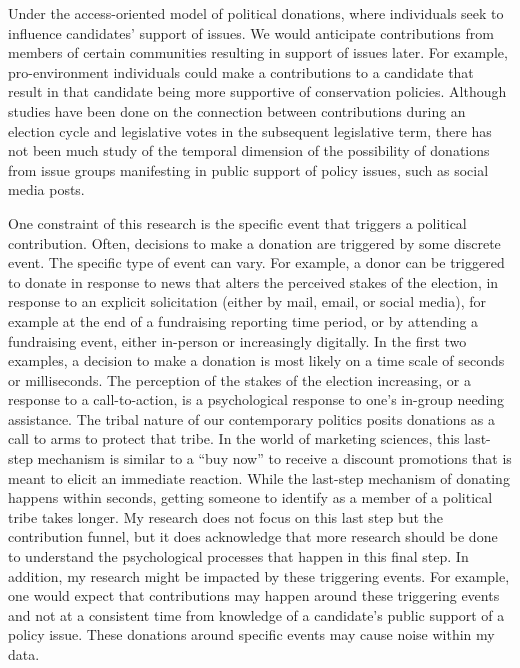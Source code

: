 \documentclass[12pt,]{article}
\begin{document}
Under the access-oriented model of political donations, where
individuals seek to influence candidates' support of issues. We would
anticipate contributions from members of certain communities resulting
in support of issues later. For example, pro-environment individuals
could make a contributions to a candidate that result in that candidate
being more supportive of conservation policies. Although studies have
been done on the connection between contributions during an election
cycle and legislative votes in the subsequent legislative term, there
has not been much study of the temporal dimension of the possibility of
donations from issue groups manifesting in public support of policy
issues, such as social media posts.

One constraint of this research is the specific event that triggers a
political contribution. Often, decisions to make a donation are
triggered by some discrete event. The specific type of event can vary.
For example, a donor can be triggered to donate in response to news that
alters the perceived stakes of the election, in response to an explicit
solicitation (either by mail, email, or social media), for example at
the end of a fundraising reporting time period, or by attending a
fundraising event, either in-person or increasingly digitally. In the
first two examples, a decision to make a donation is most likely on a
time scale of seconds or milliseconds. The perception of the stakes of
the election increasing, or a response to a call-to-action, is a
psychological response to one's in-group needing assistance. The tribal
nature of our contemporary politics posits donations as a call to arms
to protect that tribe. In the world of marketing sciences, this
last-step mechanism is similar to a ``buy now'' to receive a discount
promotions that is meant to elicit an immediate reaction. While the
last-step mechanism of donating happens within seconds, getting someone
to identify as a member of a political tribe takes longer. My research
does not focus on this last step but the contribution funnel, but it
does acknowledge that more research should be done to understand the
psychological processes that happen in this final step. In addition, my
research might be impacted by these triggering events. For example, one
would expect that contributions may happen around these triggering
events and not at a consistent time from knowledge of a candidate's
public support of a policy issue. These donations around specific events
may cause noise within my data.
\end{document}
